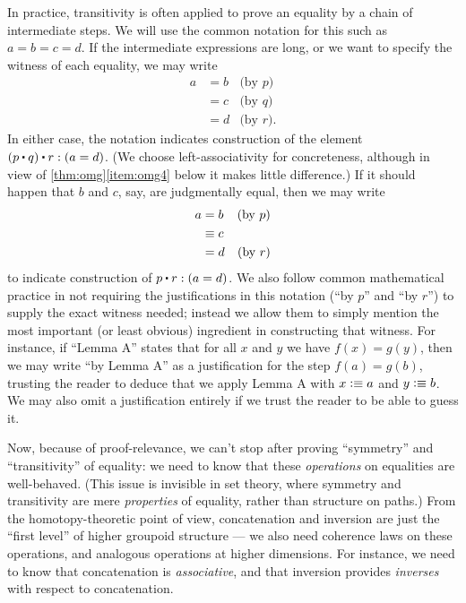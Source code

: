 In practice, transitivity is often applied to prove an equality by a chain of intermediate steps.
We will use the common notation for this such as $a=b=c=d$.
If the intermediate expressions are long, or we want to specify the witness of each equality, we may write
\begin{align*}
  a &= b & \text{(by $p$)}\\ &= c &\text{(by $q$)} \\ &= d &\text{(by $r$)}.
\end{align*}
In either case, the notation indicates construction of the element $(p\ct q)\ct r: (a=d)$.
(We choose left-associativity for concreteness, although in view of \cref{thm:omg}\ref{item:omg4} below it makes little difference.)
If it should happen that $b$ and $c$, say, are judgmentally equal, then we may write
\begin{align*}
  a &= b & \text{(by $p$)}\\ &\equiv c \\ &= d &\text{(by $r$)}
\end{align*}
to indicate construction of $p\ct r : (a=d)$.
We also follow common mathematical practice in not requiring the justifications in this notation (``by $p$'' and ``by $r$'') to supply the exact witness needed; instead we allow them to simply mention the most important (or least obvious) ingredient in constructing that witness.
For instance, if ``Lemma A'' states that for all $x$ and $y$ we have $f(x)=g(y)$, then we may write ``by Lemma A'' as a justification for the step $f(a) = g(b)$, trusting the reader to deduce that we apply Lemma A with $x\vcentcolon\equiv a$ and $y\vcentcolon\equiv b$.
We may also omit a justification entirely if we trust the reader to be able to guess it.

Now, because of proof-relevance, we can't stop after proving ``symmetry'' and ``transitivity'' of equality: we need to know that these \emph{operations} on equalities are well-behaved.
(This issue is invisible in set theory, where symmetry and transitivity are mere \emph{properties} of equality, rather than structure on
paths.)
From the homotopy-theoretic point of view, concatenation and inversion are just the ``first level'' of higher groupoid structure --- we also need coherence laws on these operations, and analogous operations at higher dimensions.
For instance, we need to know that concatenation is \emph{associative}, and that inversion provides \emph{inverses} with respect to concatenation.

